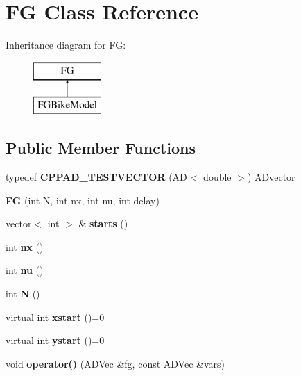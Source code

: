 \hypertarget{classFG}{}\section{FG Class Reference}
\label{classFG}
Inheritance diagram for FG\+:\begin{figure}[H]
\begin{center}
\leavevmode
\includegraphics[height=2.000000cm]{classFG}
\end{center}
\end{figure}
\subsection*{Public Member Functions}
\begin{DoxyCompactItemize}
\item 
\mbox{\label{classFG_a1d0ea758b8e411980defa56ee41e83db}} 
typedef {\bfseries C\+P\+P\+A\+D\+\_\+\+T\+E\+S\+T\+V\+E\+C\+T\+OR} (AD$<$ double $>$) A\+Dvector
\item 
\mbox{\label{classFG_ad8d5b841e141d73f431968357d346047}} 
{\bfseries FG} (int N, int nx, int nu, int delay)
\item 
\mbox{\label{classFG_a666260d6b85bc941d7d8d939f96117b2}} 
vector$<$ int $>$ \& {\bfseries starts} ()
\item 
\mbox{\label{classFG_aef0b4351d9e8a490c453e10d501b5544}} 
int {\bfseries nx} ()
\item 
\mbox{\label{classFG_a20af242c275013b5dda8e07f610f216b}} 
int {\bfseries nu} ()
\item 
\mbox{\label{classFG_ae3dede818b580152a1b1f89518559a96}} 
int {\bfseries N} ()
\item 
\mbox{\label{classFG_a494a125045b4f991fbae83ed3dfc3f4a}} 
virtual int {\bfseries xstart} ()=0
\item 
\mbox{\label{classFG_a9b7797b2c2180297b55f9be13b08cc58}} 
virtual int {\bfseries ystart} ()=0
\item 
\mbox{\label{classFG_a3261eee876229f681c54f8b74b54564f}} 
void {\bfseries operator()} (A\+D\+Vec \&fg, const A\+D\+Vec \&vars)
\end{DoxyCompactItemize}

